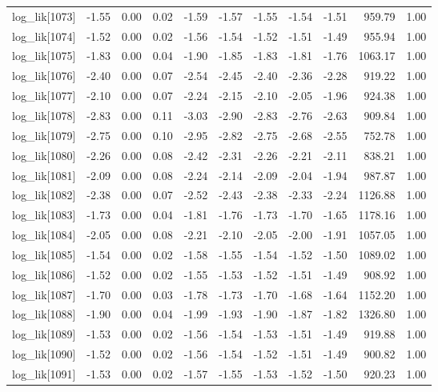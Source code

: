 \begin{table}[ht]
\begin{tabular}{rrrrrrrrrrr}
  log\_lik[1073] & -1.55 & 0.00 & 0.02 & -1.59 & -1.57 & -1.55 & -1.54 & -1.51 & 959.79 & 1.00 \\ 
  log\_lik[1074] & -1.52 & 0.00 & 0.02 & -1.56 & -1.54 & -1.52 & -1.51 & -1.49 & 955.94 & 1.00 \\ 
  log\_lik[1075] & -1.83 & 0.00 & 0.04 & -1.90 & -1.85 & -1.83 & -1.81 & -1.76 & 1063.17 & 1.00 \\ 
  log\_lik[1076] & -2.40 & 0.00 & 0.07 & -2.54 & -2.45 & -2.40 & -2.36 & -2.28 & 919.22 & 1.00 \\ 
  log\_lik[1077] & -2.10 & 0.00 & 0.07 & -2.24 & -2.15 & -2.10 & -2.05 & -1.96 & 924.38 & 1.00 \\ 
  log\_lik[1078] & -2.83 & 0.00 & 0.11 & -3.03 & -2.90 & -2.83 & -2.76 & -2.63 & 909.84 & 1.00 \\ 
  log\_lik[1079] & -2.75 & 0.00 & 0.10 & -2.95 & -2.82 & -2.75 & -2.68 & -2.55 & 752.78 & 1.00 \\ 
  log\_lik[1080] & -2.26 & 0.00 & 0.08 & -2.42 & -2.31 & -2.26 & -2.21 & -2.11 & 838.21 & 1.00 \\ 
  log\_lik[1081] & -2.09 & 0.00 & 0.08 & -2.24 & -2.14 & -2.09 & -2.04 & -1.94 & 987.87 & 1.00 \\ 
  log\_lik[1082] & -2.38 & 0.00 & 0.07 & -2.52 & -2.43 & -2.38 & -2.33 & -2.24 & 1126.88 & 1.00 \\ 
  log\_lik[1083] & -1.73 & 0.00 & 0.04 & -1.81 & -1.76 & -1.73 & -1.70 & -1.65 & 1178.16 & 1.00 \\ 
  log\_lik[1084] & -2.05 & 0.00 & 0.08 & -2.21 & -2.10 & -2.05 & -2.00 & -1.91 & 1057.05 & 1.00 \\ 
  log\_lik[1085] & -1.54 & 0.00 & 0.02 & -1.58 & -1.55 & -1.54 & -1.52 & -1.50 & 1089.02 & 1.00 \\ 
  log\_lik[1086] & -1.52 & 0.00 & 0.02 & -1.55 & -1.53 & -1.52 & -1.51 & -1.49 & 908.92 & 1.00 \\ 
  log\_lik[1087] & -1.70 & 0.00 & 0.03 & -1.78 & -1.73 & -1.70 & -1.68 & -1.64 & 1152.20 & 1.00 \\ 
  log\_lik[1088] & -1.90 & 0.00 & 0.04 & -1.99 & -1.93 & -1.90 & -1.87 & -1.82 & 1326.80 & 1.00 \\ 
  log\_lik[1089] & -1.53 & 0.00 & 0.02 & -1.56 & -1.54 & -1.53 & -1.51 & -1.49 & 919.88 & 1.00 \\ 
  log\_lik[1090] & -1.52 & 0.00 & 0.02 & -1.56 & -1.54 & -1.52 & -1.51 & -1.49 & 900.82 & 1.00 \\ 
  log\_lik[1091] & -1.53 & 0.00 & 0.02 & -1.57 & -1.55 & -1.53 & -1.52 & -1.50 & 920.23 & 1.00 \\ 

\end{tabular}
\end{table}
